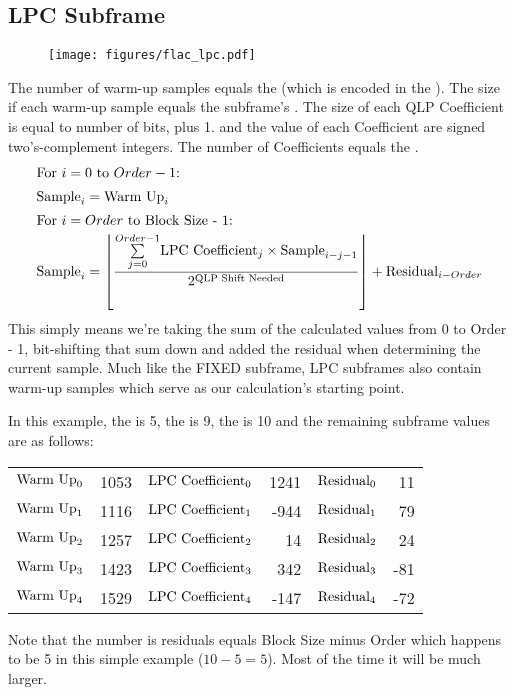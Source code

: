 \clearpage

\subsection{LPC Subframe}
\begin{figure}[h]
\texttt{[image: figures/flac\_lpc.pdf]}
\end{figure}
\par
\noindent
The number of warm-up samples equals the 
(which is encoded in the ).
The size if each warm-up sample equals the subframe's .
The size of each QLP Coefficient is equal to
 number of bits, plus 1.
 and the value of each Coefficient are
signed two's-complement integers.
The number of Coefficients equals the .
\begin{align*}
\intertext{For $i = 0$ to $Order - 1$:}
\text{Sample}_i &= \text{Warm Up}_i \\
\intertext{For $i = Order$ to Block Size - 1:}
\text{Sample}_i &= \left\lfloor \frac{\overset{Order - 1}{\underset{j = 0}{\sum}}
  \text{LPC Coefficient}_j \times \text{Sample}_{i - j - 1} } {2 ^ \text{QLP Shift Needed}}\right\rfloor + \text{Residual}_{i - Order}
\end{align*}
This simply means we're taking the sum of the calculated values from
0 to Order - 1, bit-shifting that sum down and added the residual
when determining the current sample.
Much like the FIXED subframe, LPC subframes also contain warm-up
samples which serve as our calculation's starting point.

In this example, the  is 5, the  is 9,
the  is 10
and the remaining subframe values are as follows:

\begin{table}[h]
\begin{tabular}{r r | r r | r r }
$\text{Warm Up}_0$ & 1053 &
$\text{LPC Coefficient}_0$ & 1241 &
$\text{Residual}_0$ & 11 \\
$\text{Warm Up}_1$ & 1116 &
$\text{LPC Coefficient}_1$ & -944 &
$\text{Residual}_1$ & 79 \\
$\text{Warm Up}_2$ & 1257 &
$\text{LPC Coefficient}_2$ & 14 &
$\text{Residual}_2$ & 24 \\
$\text{Warm Up}_3$ & 1423 &
$\text{LPC Coefficient}_3$ & 342 &
$\text{Residual}_3$ & -81 \\
$\text{Warm Up}_4$ & 1529 &
$\text{LPC Coefficient}_4$ & -147 &
$\text{Residual}_4$ & -72 \\
\end{tabular}
\end{table}
\par
\noindent
Note that the number is residuals equals Block Size minus Order
which happens to be 5 in this simple example ($10 - 5 = 5$).
Most of the time it will be much larger.

